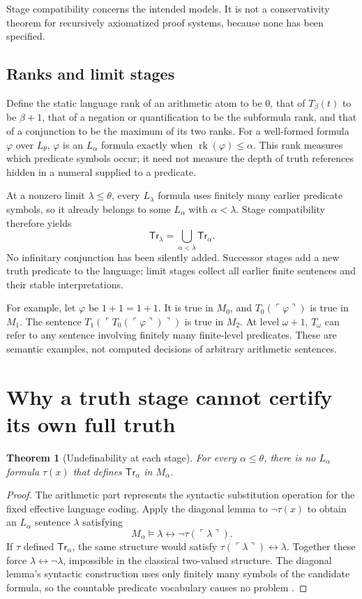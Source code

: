 \documentclass[11pt]{article}
\newtheorem{theorem}{Theorem}[section]
\theoremstyle{definition}
\newcommand{\code}[1]{\ulcorner #1\urcorner}
\newcommand{\rank}{\operatorname{rk}}
\begin{document}
Stage compatibility concerns the intended models. It is not a conservativity theorem for recursively axiomatized proof systems, because none has been specified.

\subsection{Ranks and limit stages}
Define the static language rank of an arithmetic atom to be $0$, that of $T_\beta(t)$ to be $\beta+1$, that of a negation or quantification to be the subformula rank, and that of a conjunction to be the maximum of its two ranks. For a well-formed formula $\varphi$ over $L_\theta$, $\varphi$ is an $L_\alpha$ formula exactly when $\rank(\varphi)\le\alpha$. This rank measures which predicate symbols occur; it need not measure the depth of truth references hidden in a numeral supplied to a predicate.

At a nonzero limit $\lambda\le\theta$, every $L_\lambda$ formula uses finitely many earlier predicate symbols, so it already belongs to some $L_\alpha$ with $\alpha<\lambda$. Stage compatibility therefore yields
\[
\mathsf{Tr}_\lambda=\bigcup_{\alpha<\lambda}\mathsf{Tr}_\alpha.
\]
No infinitary conjunction has been silently added. Successor stages add a new truth predicate to the language; limit stages collect all earlier finite sentences and their stable interpretations.

For example, let $\varphi$ be $1+1=1+1$. It is true in $M_0$, and $T_0(\code{\varphi})$ is true in $M_1$. The sentence
$T_1(\code{T_0(\code{\varphi})})$ is true in $M_2$. At level $\omega+1$, $T_\omega$ can refer to any sentence involving finitely many finite-level predicates. These are semantic examples, not computed decisions of arbitrary arithmetic sentences.

\section{Why a truth stage cannot certify its own full truth}
\begin{theorem}[Undefinability at each stage]
For every $\alpha\le\theta$, there is no $L_\alpha$ formula $\tau(x)$ that defines $\mathsf{Tr}_\alpha$ in $M_\alpha$.
\end{theorem}
\begin{proof}
The arithmetic part represents the syntactic substitution operation for the fixed effective language coding. Apply the diagonal lemma to $\neg\tau(x)$ to obtain an $L_\alpha$ sentence $\lambda$ satisfying
\[
M_\alpha\models\lambda\leftrightarrow\neg\tau(\code{\lambda}).
\]
If $\tau$ defined $\mathsf{Tr}_\alpha$, the same structure would satisfy
$\tau(\code{\lambda})\leftrightarrow\lambda$. Together these force $\lambda\leftrightarrow\neg\lambda$, impossible in the classical two-valued structure. The diagonal lemma's syntactic construction uses only finitely many symbols of the candidate formula, so the countable predicate vocabulary causes no problem \cite{beeson}.
\end{proof}
\end{document}
